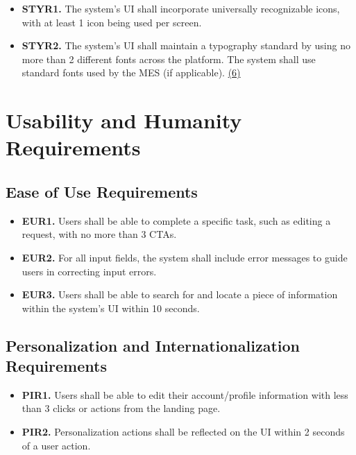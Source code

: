 \documentclass[12pt]{article}
\begin{document}
\label{STYR}

\begin{itemize}
    \item \hypertarget{STYROne}{ \textbf{STYR1.} The system's UI shall incorporate universally recognizable icons, with at least 1 icon being used per screen. }
    \item \hypertarget{STYRTWo}{ \textbf{STYR2.} The system's UI shall maintain a typography standard by using no more than 2 different fonts across the platform. The system shall use standard fonts used by the MES (if applicable). \hyperlink{Ref6}{(6)} }
\end{itemize}

\section{Usability and Humanity Requirements}

\label{UseandHum}

\subsection{Ease of Use Requirements}

\label{EUR}

\begin{itemize}
    \item \hypertarget{EUROne}{ \textbf{EUR1.} Users shall be able to complete a specific task, such as editing a request, with no more than 3 CTAs. }
    \item \hypertarget{EURTwo}{ \textbf{EUR2.} For all input fields, the system shall include error messages to guide users in correcting input errors. }
    \item \hypertarget{EURThree}{ \textbf{EUR3.} Users shall be able to search for and locate a piece of information within the system's UI within 10 seconds. }
\end{itemize}

\subsection{Personalization and Internationalization Requirements}

\label{PIR}

\begin{itemize}
    \item \hypertarget{PIROne}{ \textbf{PIR1.} Users shall be able to edit their account/profile information with less than 3 clicks or actions from the landing page. }
    \item \hypertarget{PIRTwo}{ \textbf{PIR2.} Personalization actions shall be reflected on the UI within 2 seconds of a user action. }
\end{itemize}
\end{document}
